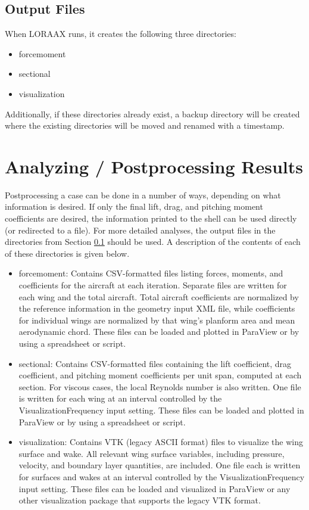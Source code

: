\documentclass[11pt]{article}
\begin{document}
\subsection{Output Files}\label{sec:output}

When LORAAX runs, it creates the following three directories:

\begin{itemize}
	\item forcemoment
	\item sectional
	\item visualization
\end{itemize}

Additionally, if these directories already exist, a backup directory will be
created where the existing directories will be moved and renamed with a
timestamp.

\section{Analyzing / Postprocessing Results}

Postprocessing a case can be done in a number of ways, depending on what
information is desired. If only the final lift, drag, and pitching moment
coefficients are desired, the information printed to the shell can be used
directly (or redirected to a file). For more detailed analyses, the output files
in the directories from Section \ref{sec:output} should be used. A description
of the contents of each of these directories is given below.

\begin{itemize}
	\item forcemoment: Contains CSV-formatted files listing forces, moments, and
		coefficients for the aircraft at each iteration. Separate files are
		written for each wing and the total aircraft. Total aircraft
		coefficients are normalized by the reference information in the geometry
		input XML file, while coefficients for individual wings are normalized
		by that wing's planform area and mean aerodynamic chord. These files
		can be loaded and plotted in ParaView or by using a spreadsheet or
		script.
	\item sectional: Contains CSV-formatted files containing the lift
		coefficient, drag coefficient, and pitching moment coefficients per unit
		span, computed at each section. For viscous cases, the local Reynolds
		number is also written. One file is written for each wing at an interval
		controlled by the VisualizationFrequency input setting. These files can
		be loaded and plotted in ParaView or by using a spreadsheet or script.
	\item visualization: Contains VTK (legacy ASCII format) files to visualize
		the wing surface and wake. All relevant wing surface variables,
		including pressure, velocity, and boundary layer quantities, are
		included. One file each is written for surfaces and wakes at an interval
		controlled by the VisualizationFrequency input setting. These files can
		be loaded and visualized in ParaView or any other visualization package
		that supports the legacy VTK format.
\end{itemize}
\end{document}
